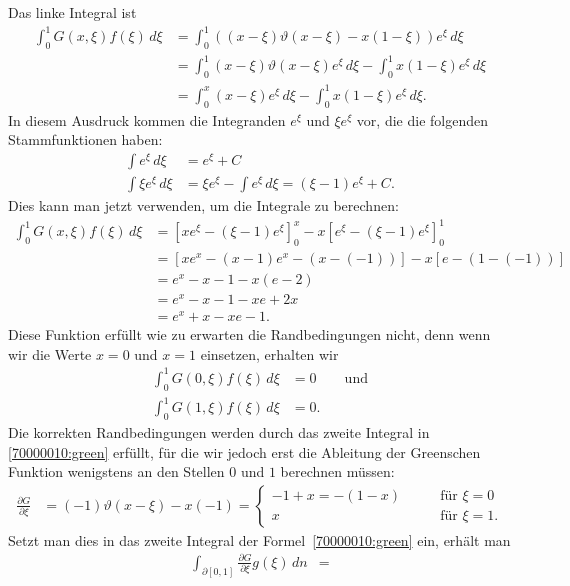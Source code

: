 \begin{loesung}
Das linke Integral ist
\begin{align*}
\int_0^1 G(x,\xi) f(\xi)\,d\xi
&=
\int_0^1 ( (x-\xi)\vartheta(x-\xi) -x(1-\xi)) e^{\xi} \,d\xi
\\
&=
\int_0^1 (x-\xi)\vartheta(x-\xi) e^{\xi} \,d\xi
-
\int_0^1 x(1-\xi) e^{\xi} \,d\xi
\\
&=
\int_0^x (x-\xi) e^{\xi} \,d\xi
-
\int_0^1 x(1-\xi) e^{\xi} \,d\xi.
\end{align*}
In diesem Ausdruck kommen die Integranden $e^\xi$ und $\xi e^\xi$ vor,
die die folgenden Stammfunktionen haben:
\begin{align*}
\int e^\xi\,d\xi&=e^\xi + C\\
\int \xi e^\xi\,d\xi&=\xi e^\xi - \int e^\xi\,d\xi = (\xi - 1)e^\xi + C.
\end{align*}
Dies kann man jetzt verwenden, um die Integrale zu berechnen:
\begin{align*}
\int_0^1 G(x,\xi) f(\xi)\,d\xi
&=
\left[
xe^\xi -(\xi - 1)e^\xi
\right]_0^x
-
x\left[
e^\xi-(\xi - 1)e^\xi
\right]_0^1
\\
&=
\left[
xe^x-(x-1)e^x
-
(x-(-1))
\right]
-
x
\left[
e - (1-(-1))
\right]
\\
&=
e^x-x-1
-
x(e-2)
\\
&=
e^x-x-1
-xe+2x
\\
&=
e^x+x-xe-1.
\end{align*}
Diese Funktion erfüllt wie zu erwarten die Randbedingungen nicht, denn
wenn wir die Werte $x=0$ und $x=1$ einsetzen, erhalten wir
\begin{align*}
\int_0^1 G(0,\xi) f(\xi)\,d\xi
&=0\qquad\text{und}
\\
\int_0^1 G(1,\xi) f(\xi)\,d\xi
&=0.
\end{align*}
Die korrekten Randbedingungen werden durch das zweite Integral in
\eqref{70000010:green} erfüllt, für die wir jedoch erst die
Ableitung der Greenschen Funktion wenigstens an den Stellen $0$ und $1$
berechnen müssen:
\begin{align*}
\frac{\partial G}{\partial\xi}
&=(-1)\vartheta(x-\xi) - x(-1)
=\begin{cases}
-1+x=-(1-x)
\qquad&\text{für $\xi=0$}
\\
x
\qquad&\text{für $\xi=1$.}
\end{cases}
\end{align*}
Setzt man dies in das zweite Integral der Formel~\eqref{70000010:green} ein,
erhält man
\begin{align*}
\int_{\partial[0,1]}\frac{\partial G}{\partial \xi} g(\xi)\,dn
&=

\end{align*}
\end{loesung}
